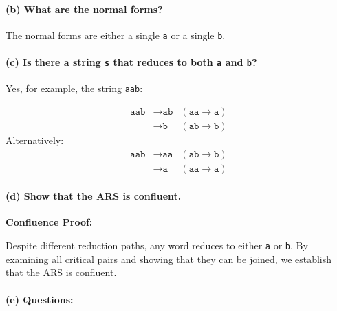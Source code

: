 \documentclass{article}
\theoremstyle{theorem}
\theoremstyle{definition}
\theoremstyle{remark}
\begin{document}
\paragraph{(b) What are the normal forms?}

The normal forms are either a single \texttt{a} or a single \texttt{b}.

\paragraph{(c) Is there a string \texttt{s} that reduces to both \texttt{a} and \texttt{b}?}

Yes, for example, the string \texttt{aab}:

\[
\begin{aligned}
\texttt{aab} &\to \texttt{ab} &(\texttt{aa} \to \texttt{a}) \\
&\to \texttt{b} &(\texttt{ab} \to \texttt{b})
\end{aligned}
\]
Alternatively:
\[
\begin{aligned}
\texttt{aab} &\to \texttt{aa} &(\texttt{ab} \to \texttt{b}) \\
&\to \texttt{a} &(\texttt{aa} \to \texttt{a})
\end{aligned}
\]

\paragraph{(d) Show that the ARS is confluent.}

\textbf{Confluence Proof:}

Despite different reduction paths, any word reduces to either \texttt{a} or \texttt{b}. By examining all critical pairs and showing that they can be joined, we establish that the ARS is confluent.

\paragraph{(e) Questions:}
\end{document}
